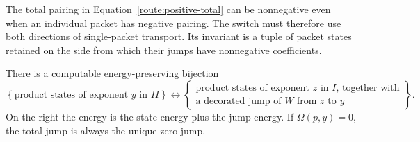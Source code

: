The total pairing in Equation~\eqref{route:positive-total} can be
nonnegative even when an individual packet has negative pairing.
The switch must therefore use both directions of single-packet
transport. Its invariant is a tuple of packet states retained on
the side from which their jumps have nonnegative coefficients.

\begin{proposition}
\label{route:switch}
There is a computable energy-preserving bijection
\begin{equation}
 \label{route:switch-equation}
 \left\{\text{product states of exponent $y$ in $II$}\right\}
 \longleftrightarrow
 \left\{\begin{array}{c}
  \text{product states of exponent $z$ in $I$, together with}\\
  \text{a decorated jump of $W$ from $z$ to $y$}
 \end{array}\right\}.
\end{equation}
On the right the energy is the state energy plus the jump energy.
If $\Omega(p,y)=0$, the total jump is always the unique zero jump.
\end{proposition}

